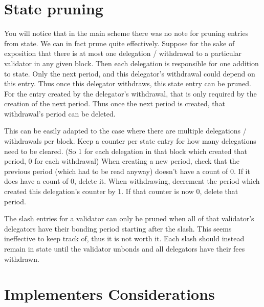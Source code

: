 \documentclass[]{article}
\begin{document}
\section{State pruning}
You will notice that in the main scheme there was no note for pruning entries from state.
We can in fact prune quite effectively.
Suppose for the sake of exposition that there is at most one delegation / withdrawal to a particular validator in any given block.
Then each delegation is responsible for one addition to state.
Only the next period, and this delegator's withdrawal could depend on this entry. Thus once this delegator withdraws, this state entry can be pruned.
For the entry created by the delegator's withdrawal, that is only required by the creation of the next period.
Thus once the next period is created, that withdrawal's period can be deleted.

This can be easily adapted to the case where there are multiple delegations / withdrawals per block.
Keep a counter per state entry for how many delegations need to be cleared.
(So 1 for each delegation in that block which created that period, 0 for each withdrawal)
When creating a new period, check that the previous period (which had to be read anyway) doesn't have a count of 0.
If it does have a count of 0, delete it.
When withdrawing, decrement the period which created this delegation's counter by 1.
If that counter is now 0, delete that period.

The slash entries for a validator can only be pruned when all of that validator's delegators have their bonding period starting after the slash.
This seems ineffective to keep track of, thus it is not worth it.
Each slash should instead remain in state until the validator unbonds and all delegators have their fees withdrawn.

\section{Implementers Considerations}
\end{document}
